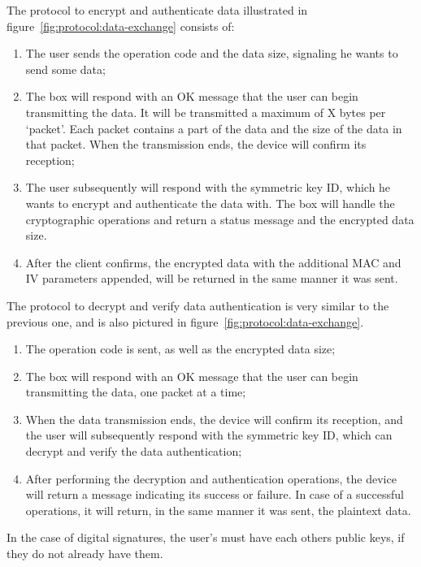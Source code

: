 The protocol to encrypt and authenticate data illustrated in figure~\ref{fig:protocol:data-exchange} consists of:
\begin{enumerate}
	\item The user sends the operation code and the data size, signaling he wants to send some data;
	\item The box will respond with an OK message that the user can begin transmitting the data. It will be transmitted a maximum of X bytes per `packet'. Each packet contains a part of the data and the size of the data in that packet. When the transmission ends, the device will confirm its reception;
	\item The user subsequently will respond with the symmetric key ID, which he wants to encrypt and authenticate the data with. The box will handle the cryptographic operations and return a status message and the encrypted data size.
	\item After the client confirms, the encrypted data with the additional MAC and IV parameters appended, will be returned in the same manner it was sent.
\end{enumerate}

The protocol to decrypt and verify data authentication is very similar to the previous one, and is also pictured in figure~\ref{fig:protocol:data-exchange}.

\begin{enumerate}
	\item The operation code is sent, as well as the encrypted data size;
	\item The box will respond with an OK message that the user can begin transmitting the data, one packet at a time;
	\item When the data transmission ends, the device will confirm its reception, and the user will subsequently respond with the symmetric key ID, which can decrypt and verify the data authentication;
	\item After performing the decryption and authentication operations, the device will return a message indicating its success or failure. In case of a successful operations, it will return, in the same manner it was sent, the plaintext data.
\end{enumerate}

In the case of digital signatures, the user's must have each others public keys, if they do not already have them.


